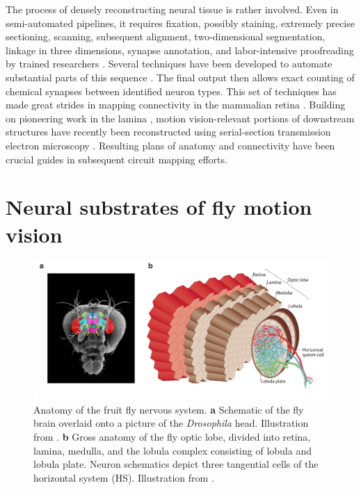 The process of densely reconstructing neural tissue is rather involved. Even in semi-automated pipelines, it requires fixation, possibly staining, extremely precise sectioning, scanning, subsequent alignment, two-dimensional segmentation, linkage in three dimensions, synapse annotation, and labor-intensive proofreading by trained researchers \citep{Takemura:2015aa}. Several techniques have been developed to automate substantial parts of this sequence \citep{Denk:2004aa,Jain:2010ff}. The final output then allows exact counting of chemical synapses between identified neuron types. This set of techniques has made great strides in mapping connectivity in the mammalian retina \citep{Briggman:2011aa,Helmstaedter:2013iv,Kim:2014aa}. Building on pioneering work in the lamina \citep{Meinertzhagen:1991aa}, motion vision-relevant portions of downstream structures have recently been reconstructed using serial-section transmission electron microscopy \citep[ssTEM;][]{Takemura:2008ee,Takemura:2011iy,Takemura:2013ea,RiveraAlba:2011dd,Shinomiya:2014dx}. Resulting plans of anatomy and connectivity have been crucial guides in subsequent circuit mapping efforts.

\section{Neural substrates of fly motion vision}

\begin{figure}
    \centering
    \includegraphics[width=1.0\textwidth]{graphics/figure_lobe}
    \caption[Anatomy of the fly visual system]
    {Anatomy of the fruit fly nervous system. \textbf{a} Schematic of the fly brain overlaid onto a picture of the \textit{Drosophila} head. Illustration from \citet{Ito:2014aa}. \textbf{b} Gross anatomy of the fly optic lobe, divided into retina, lamina, medulla, and the lobula complex consisting of lobula and lobula plate. Neuron schematics depict three tangential cells of the horizontal system (HS). Illustration from \citet{Borst:2014kl}.}
    \label{fig:anatomy}
\end{figure}

